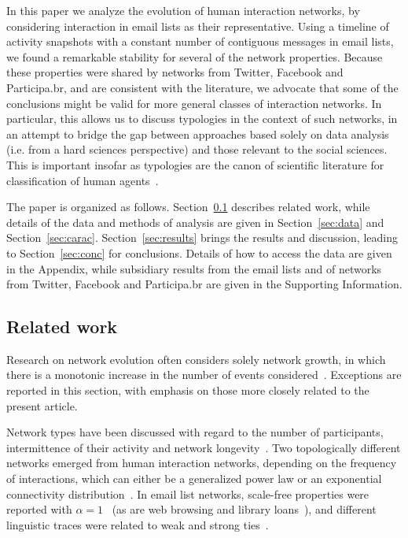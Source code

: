 \documentclass[%
	aip,
	jmp,%
	amsmath,amssymb,
	reprint,%
]{revtex4-1}
\begin{document}
In this paper we analyze the evolution of human interaction networks, by considering interaction in email lists as their representative. Using a timeline of activity snapshots with a constant number of contiguous messages in email lists, we found a remarkable stability for several of the network properties. Because these properties were shared by networks from Twitter, Facebook and Participa.br, and are consistent with the literature, we advocate that some of the conclusions might be valid for more general classes of interaction networks. In particular, this allows us to discuss typologies in the context of such networks, in an attempt to bridge the gap between approaches based solely on data analysis (i.e. from a hard sciences perspective) and those relevant to the social sciences. This is important insofar as typologies are the canon of scientific literature for classification of human agents~\cite{typCanon}. 

The paper is organized as follows. Section~\ref{sec:related} describes related work, while details of the data and methods of analysis are given in  Section~\ref{sec:data} and Section~\ref{sec:carac}. Section~\ref{sec:results} brings the results and discussion, leading to Section~\ref{sec:conc} for conclusions. Details of how to access the data are given in the Appendix, while subsidiary results from the email lists and of networks from Twitter, Facebook and Participa.br are given in the Supporting Information.

\subsection{Related work}\label{sec:related}
Research on network evolution often considers solely network growth, in which there is a monotonic increase in the number of events considered~\cite{barabasiEvo}. Exceptions are reported in this section, with emphasis on those more closely related to the present article.

Network types have been discussed with regard to the number of participants, intermittence of their activity and network longevity~\cite{barabasiEvo}. Two topologically different networks emerged from human interaction networks, depending on the frequency of interactions, which can either be a generalized power law or an exponential connectivity distribution~\cite{barabasiTopologicalEv}. In email list networks, scale-free properties were reported with $\alpha=1$~\cite{bird} (as are web browsing and library loans~\cite{barabasiHumanDyn}), and different linguistic traces were related to weak and strong ties~\cite{GMANE2}.
\end{document}
